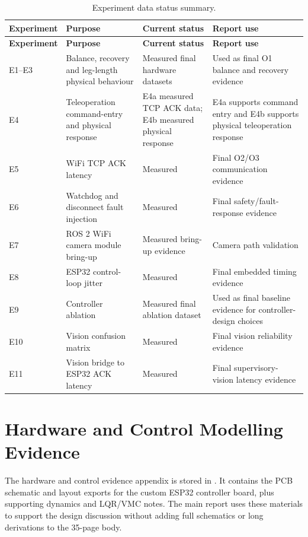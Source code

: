 \documentclass[12pt, a4paper]{article}
\begin{document}
\begingroup
\singlespacing
\scriptsize
\setlength{\tabcolsep}{2pt}
\renewcommand{\arraystretch}{1.15}
\begin{longtable}{>{\RaggedRight\arraybackslash}p{}>{\RaggedRight\arraybackslash}p{}>{\RaggedRight\arraybackslash}p{}>{\RaggedRight\arraybackslash}p{}}
\caption{Experiment data status summary.}\\
\toprule
\textbf{Experiment} & \textbf{Purpose} & \textbf{Current status} & \textbf{Report use} \\
\midrule
\endfirsthead
\toprule
\textbf{Experiment} & \textbf{Purpose} & \textbf{Current status} & \textbf{Report use} \\
\midrule
\endhead
E1--E3 & Balance, recovery and leg-length physical behaviour & Measured final hardware datasets & Used as final O1 balance and recovery evidence \\
E4 & Teleoperation command-entry and physical response & E4a measured TCP ACK data; E4b measured physical response & E4a supports command entry and E4b supports physical teleoperation response \\
E5 & WiFi TCP ACK latency & Measured & Final O2/O3 communication evidence \\
E6 & Watchdog and disconnect fault injection & Measured & Final safety/fault-response evidence \\
E7 & ROS 2 WiFi camera module bring-up & Measured bring-up evidence & Camera path validation \\
E8 & ESP32 control-loop jitter & Measured & Final embedded timing evidence \\
E9 & Controller ablation & Measured final ablation dataset & Used as final baseline evidence for controller-design choices \\
E10 & Vision confusion matrix & Measured & Final vision reliability evidence \\
E11 & Vision bridge to ESP32 ACK latency & Measured & Final supervisory-vision latency evidence \\
\bottomrule
\end{longtable}
\endgroup

\section{Hardware and Control Modelling Evidence}
The hardware and control evidence appendix is stored in . It contains the PCB schematic and layout exports for the custom ESP32 controller board, plus supporting dynamics and LQR/VMC notes. The main report uses these materials to support the design discussion without adding full schematics or long derivations to the 35-page body.
\end{document}
